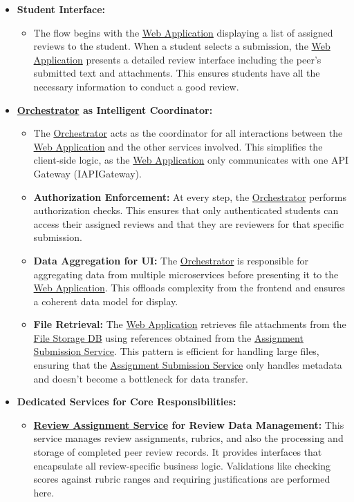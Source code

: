 \begin{itemize}
    \item \textbf{Student Interface:}
    \begin{itemize}
        \item The flow begins with the \hyperref[def:WebApplication]{Web Application} displaying a list of assigned reviews to the student. When a student selects a submission, the \hyperref[def:WebApplication]{Web Application} presents a detailed review interface including the peer's submitted text and attachments. This ensures students have all the necessary information to conduct a good review.
    \end{itemize}
    \item \textbf{\hyperref[def:Orchestrator]{Orchestrator} as Intelligent Coordinator:}
    \begin{itemize}
        \item The \hyperref[def:Orchestrator]{Orchestrator} acts as the coordinator for all interactions between the \hyperref[def:WebApplication]{Web Application} and the other services involved. This simplifies the client-side logic, as the \hyperref[def:WebApplication]{Web Application} only communicates with one API Gateway (IAPIGateway).
        \item \textbf{Authorization Enforcement:} At every step, the \hyperref[def:Orchestrator]{Orchestrator} performs authorization checks. This ensures that only authenticated students can access their assigned reviews and that they are reviewers for that specific submission.
        
        \item \textbf{Data Aggregation for UI:} The \hyperref[def:Orchestrator]{Orchestrator} is responsible for aggregating data from multiple microservices before presenting it to the \hyperref[def:WebApplication]{Web Application}. This offloads complexity from the frontend and ensures a coherent data model for display.
        
        \item \textbf{File Retrieval:} The \hyperref[def:WebApplication]{Web Application} retrieves file attachments from the \hyperref[def:FileStorageService]{File Storage DB} using references obtained from the \hyperref[def:AssignmentSubmissionService]{Assignment Submission Service}. This pattern is efficient for handling large files, ensuring that the \hyperref[def:AssignmentSubmissionService]{Assignment Submission Service} only handles metadata and doesn't become a bottleneck for data transfer.
    \end{itemize}
    \item \textbf{Dedicated Services for Core Responsibilities:}
    \begin{itemize}
        \item \textbf{\hyperref[def:ReviewAssignmentService]{Review Assignment Service} for Review Data Management:} This service manages review assignments, rubrics, and also the processing and storage of completed peer review records. It provides interfaces that encapsulate all review-specific business logic. Validations like checking scores against rubric ranges and requiring justifications are performed here.
        

\end{itemize}
\end{itemize}

